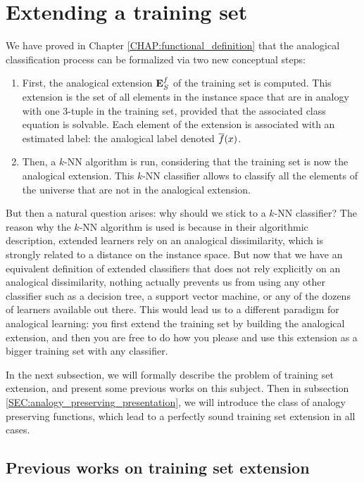 \section{Extending a training set}
\label{SEC:extending_a_training_set}

We have proved in Chapter \ref{CHAP:functional_definition} that the analogical
classification process can be formalized via two new conceptual steps:
\begin{enumerate}
  \item First, the analogical extension $\mathbf{E}_{S}^{f}$ of the training set is computed. This
    extension is the set of all elements in the instance space that are in
    analogy with one $3$-tuple in the training set, provided that the
    associated class equation is solvable. Each element of the extension is
    associated with an estimated label: the analogical label denoted $\overline{f}(x)$.
  \item Then, a $k$-NN algorithm is run, considering that the training set is
    now the analogical extension. This $k$-NN classifier allows to
    classify all the elements of the universe that are not in the analogical
    extension.
\end{enumerate}

But then a natural question arises: why should we stick to a $k$-NN classifier?
The reason why the $k$-NN algorithm is used is because in their algorithmic
description, extended learners rely on an analogical dissimilarity, which is
strongly related to a distance on the instance space. But now that we have an
equivalent definition of extended classifiers that does not rely explicitly on
an analogical dissimilarity, nothing actually prevents us from using any other
classifier such as a decision tree, a support vector machine, or any of the
dozens of learners available out there. This would lead us to a different
paradigm for analogical learning: you first extend the training set by building
the analogical extension, and then you are free to do how you please and use
this extension as a bigger training set with any classifier.

In the next subsection, we will formally describe the problem of training set
extension, and present some previous works on this subject. Then in subsection
\ref{SEC:analogy_preserving_presentation}, we will introduce the class of
analogy preserving functions, which lead to a perfectly sound training set
extension in all cases.

\subsection{Previous works on training set extension}

